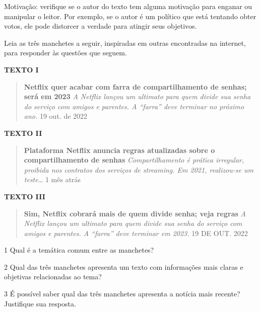 {{Motivação: verifique se o autor do texto tem alguma motivação para
enganar ou manipular o leitor. Por exemplo, se o autor é um político que
está tentando obter votos, ele pode distorcer a verdade para atingir
seus objetivos.}

Leia as três manchetes a seguir, inspiradas em outras encontradas na
internet, para responder às questões que seguem.

\textbf{TEXTO I}

\begin{quote}
\textbf{Netflix quer acabar com farra de compartilhamento de senhas;
será em 2023} \emph{A Netflix lançou um ultimato para quem divide sua
senha do serviço com amigos e parentes. A ``farra'' deve terminar no
próximo ano.} 19 out. de 2022
\end{quote}

\textbf{TEXTO II}

\begin{quote}
\textbf{Plataforma Netflix anuncia regras atualizadas sobre o
compartilhamento de senhas} \emph{Compartilhamento é prática irregular,
proibida nos contratos dos serviços de streaming. Em 2021, realizou-se
um teste\ldots{}} 1 mês atrás
\end{quote}

\textbf{TEXTO III}

\begin{quote}
\textbf{Sim, Netflix cobrará mais de quem divide senha; veja regras}
\emph{A Netflix lançou um ultimato para quem divide sua senha do serviço
com amigos e parentes. A ``farra'' deve terminar em 2023.} 19 DE OUT.
2022
\end{quote}

\num{1} Qual é a temática comum entre as manchetes?



\num{2} Qual das três manchetes apresenta um texto com informações mais
claras e objetivas relacionadas ao tema?



\num{3} É possível saber qual das três manchetes apresenta a notícia
mais recente? Justifique sua resposta.



}
